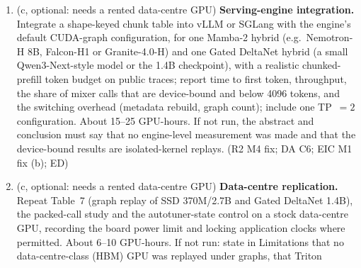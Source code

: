 \documentclass[11pt]{article}
\begin{document}
\begin{enumerate}[label=M3\alph*.]
        for Gated DeltaNet), the median round-to-round deviation is 1.4\%
        (90th percentile 6.3\%), and the steps were timed in device time
        behind the 20\,ms spin that S1.1 and S8 reject for multi-kernel
        pipelines. Re-time the packed steps under CUDA-graph replay with at
        least five rounds and a noise floor (split-half or a null as in S12);
        capture packed variable-length steps at padded capture sizes (16 to
        512 tokens and up to the largest prefill budget an engine would
        capture), replay them with varying composition, and report the regret
        of a table keyed on capture size alone and of richer keys
        (per-sequence length structure). Apply the carried state the same way
        for SSD and Gated DeltaNet (now the first sequence vs.\ every
        sequence) or justify the difference. Revise Contribution~2 and the
        recipe's packed-length key to what the data support. About 3--5
        GPU-hours. \emph{Where:} Sec.~6.5 ``Packed variable-length calls''
        (1152--1162); Recipe (1320--1344); S10, Table S35. (DA C5; R3 M2 fix
        2; R3 m20; R2 m8)
  \item (c, optional: needs a rented data-centre GPU) \textbf{Serving-engine
        integration.} Integrate a shape-keyed chunk table into vLLM or SGLang
        with the engine's default CUDA-graph configuration, for one Mamba-2
        hybrid (e.g.\ Nemotron-H 8B, Falcon-H1 or Granite-4.0-H) and one Gated
        DeltaNet hybrid (a small Qwen3-Next-style model or the 1.4B
        checkpoint), with a realistic chunked-prefill token budget on public
        traces; report time to first token, throughput, the share of mixer
        calls that are device-bound and below 4096 tokens, and the switching
        overhead (metadata rebuild, graph count); include one TP~$=2$
        configuration. About 15--25 GPU-hours. If not run, the abstract and
        conclusion must say that no engine-level measurement was made and that
        the device-bound results are isolated-kernel replays. (R2 M4 fix; DA
        C6; EIC M1 fix (b); ED)
  \item (c, optional: needs a rented data-centre GPU)
        \textbf{Data-centre replication.} Repeat Table~7 (graph replay of SSD
        370M/2.7B and Gated DeltaNet 1.4B), the packed-call study and the
        autotuner-state control on a stock data-centre GPU, recording the
        board power limit and locking application clocks where permitted.
        About 6--10 GPU-hours. If not run: state in Limitations that no
        data-centre-class (HBM) GPU was replayed under graphs, that Triton

\end{enumerate}
\end{document}
